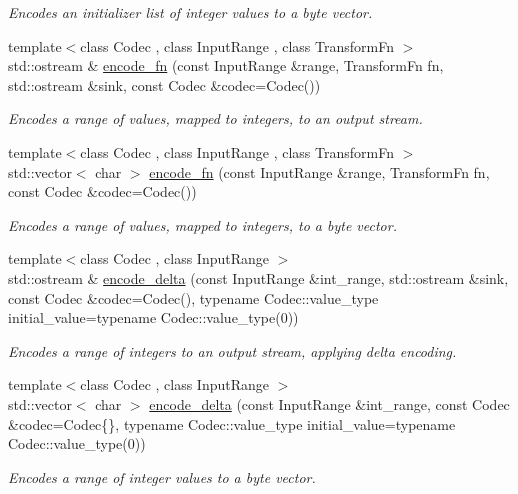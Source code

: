 \begin{DoxyCompactItemize}
\begin{DoxyCompactList}\small\item\em Encodes an initializer list of integer values to a byte vector. \end{DoxyCompactList}\item 
{\footnotesize template$<$class Codec , class Input\+Range , class Transform\+Fn $>$ }\\std\+::ostream \& \mbox{\hyperlink{namespaceirk_a1f1961138bf0a1851597756639a3bee5}{encode\+\_\+fn}} (const Input\+Range \&range, Transform\+Fn fn, std\+::ostream \&sink, const Codec \&codec=Codec())
\begin{DoxyCompactList}\small\item\em Encodes a range of values, mapped to integers, to an output stream. \end{DoxyCompactList}\item 
{\footnotesize template$<$class Codec , class Input\+Range , class Transform\+Fn $>$ }\\std\+::vector$<$ char $>$ \mbox{\hyperlink{namespaceirk_ae02f4d520c0e53d21a65398bbb4f3637}{encode\+\_\+fn}} (const Input\+Range \&range, Transform\+Fn fn, const Codec \&codec=Codec())
\begin{DoxyCompactList}\small\item\em Encodes a range of values, mapped to integers, to a byte vector. \end{DoxyCompactList}\item 
{\footnotesize template$<$class Codec , class Input\+Range $>$ }\\std\+::ostream \& \mbox{\hyperlink{namespaceirk_a76d26e66fd2b02cada45345b5ca3e995}{encode\+\_\+delta}} (const Input\+Range \&int\+\_\+range, std\+::ostream \&sink, const Codec \&codec=Codec(), typename Codec\+::value\+\_\+type initial\+\_\+value=typename Codec\+::value\+\_\+type(0))
\begin{DoxyCompactList}\small\item\em Encodes a range of integers to an output stream, applying delta encoding. \end{DoxyCompactList}\item 
{\footnotesize template$<$class Codec , class Input\+Range $>$ }\\std\+::vector$<$ char $>$ \mbox{\hyperlink{namespaceirk_a0e851f5c1edd1e639c8c5132f3027ac0}{encode\+\_\+delta}} (const Input\+Range \&int\+\_\+range, const Codec \&codec=Codec\{\}, typename Codec\+::value\+\_\+type initial\+\_\+value=typename Codec\+::value\+\_\+type(0))
\begin{DoxyCompactList}\small\item\em Encodes a range of integer values to a byte vector. \end{DoxyCompactList}\item 

\end{DoxyCompactItemize}
